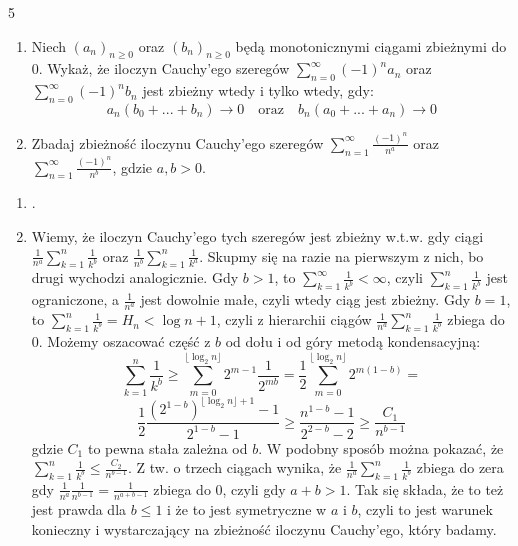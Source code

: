 \documentclass{../note}
\begin{document}
\begin{zadanie}{5}
\begin{enumerate}
    \item[(a)] Niech $(a_{n})_{n\ge0}$ oraz $(b_{n})_{n\ge0}$ będą monotonicznymi ciągami zbieżnymi do 0. Wykaż, że iloczyn Cauchy'ego szeregów $\sum_{n=0}^{\infty}(-1)^{n}a_{n}$ oraz $\sum_{n=0}^{\infty}(-1)^{n}b_{n}$ jest zbieżny wtedy i tylko wtedy, gdy:
    $$ a_{n}(b_{0}+...+b_{n})\rightarrow 0 \quad \text{oraz} \quad b_{n}(a_{0}+...+a_{n})\rightarrow 0 $$
    \item[(b)] Zbadaj zbieżność iloczynu Cauchy'ego szeregów $\sum_{n=1}^{\infty}\frac{(-1)^{n}}{n^{a}}$ oraz $\sum_{n=1}^{\infty}\frac{(-1)^{n}}{n^{b}}$, gdzie $a, b > 0$.
\end{enumerate}
\end{zadanie}
\begin{rozwiazanie}
\begin{enumerate}
    \item[(a)] .
    \item[(b)] Wiemy, że iloczyn Cauchy'ego tych szeregów jest zbieżny w.t.w. gdy ciągi $\frac{1}{n^a} \sum_{k=1}^{n}\frac{1}{k^b}$ oraz $\frac{1}{n^b} \sum_{k=1}^{n}\frac{1}{k^a}$. Skupmy się na razie na pierwszym z nich, bo drugi wychodzi analogicznie. Gdy $b > 1$, to $\sum_{k=1}^{\infty}\frac{1}{k^b} < \infty$, czyli $\sum_{k=1}^{n}\frac{1}{k^b}$ jest ograniczone, a $\frac{1}{n^a}$ jest dowolnie małe, czyli wtedy ciąg jest zbieżny. Gdy $b = 1$, to $\sum_{k=1}^{n}\frac{1}{k^b} = H_n < \log n + 1$, czyli z hierarchii ciągów $\frac{1}{n^a} \sum_{k=1}^{n}\frac{1}{k^b}$ zbiega do 0. Możemy oszacować część z $b$ od dołu i od góry metodą kondensacyjną:
    \[\sum_{k=1}^{n}\frac{1}{k^b} \geq \sum_{m=0}^{\lfloor\log_2 n \rfloor} 2^{m-1}\frac{1}{2^{mb}} = \frac12\sum_{m=0}^{\lfloor\log_2 n \rfloor}2^{m(1-b)} =\]\[ \frac{1}{2} \frac{\left(2^{1-b}\right)^{\lfloor\log_2 n \rfloor + 1} - 1}{2^{1-b}-1} \geq \frac{n^{1-b} - 1}{2^{2-b}-2} \geq \frac{C_1}{n^{b-1}}\]
    gdzie $C_1$ to pewna stała zależna od $b$. W podobny sposób można pokazać, że $\sum_{k=1}^{n}\frac{1}{k^b} \leq \frac{C_2}{n^{b-1}}$. Z tw. o trzech ciągach wynika, że $\frac{1}{n^a} \sum_{k=1}^{n}\frac{1}{k^b}$ zbiega do zera gdy $\frac{1}{n^a} \frac{1}{n^{b-1}} = \frac{1}{n^{a+b-1}}$ zbiega do 0, czyli gdy $a+b>1$. Tak się składa, że to też jest prawda dla $b \leq 1$ i że to jest symetryczne w $a$ i $b$, czyli to jest warunek konieczny i wystarczający na zbieżność iloczynu Cauchy'ego, który badamy.
\end{enumerate}
\end{rozwiazanie}
\end{document}
